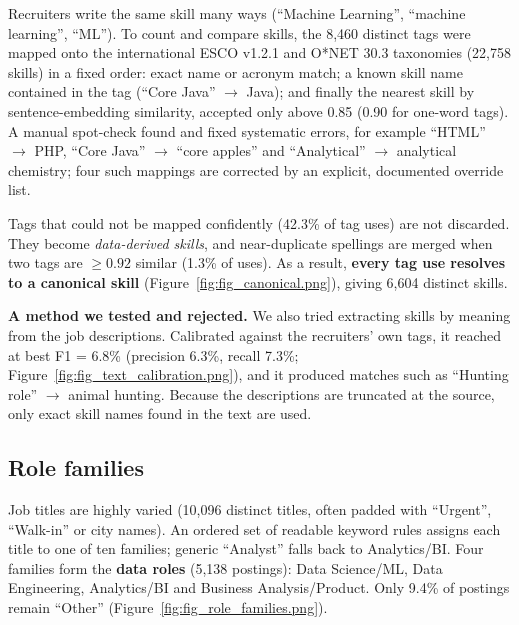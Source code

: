 Recruiters write the same skill many ways (``Machine Learning'', ``machine learning'', ``ML''). To
count and compare skills, the 8,460 distinct tags were mapped onto the international ESCO v1.2.1
and O*NET 30.3 taxonomies (22,758 skills) in a fixed order: exact name or acronym match;
a known skill name contained in the tag (``Core Java'' $\rightarrow$ Java); and finally the nearest
skill by sentence-embedding similarity, accepted only above 0.85 (0.90 for one-word tags). A manual
spot-check found and fixed systematic errors, for example ``HTML'' $\rightarrow$ PHP, ``Core Java''
$\rightarrow$ ``core apples'' and ``Analytical'' $\rightarrow$ analytical chemistry; four such
mappings are corrected by an explicit, documented override list.


Tags that could not be mapped confidently (42.3\% of tag uses) are not discarded. They become
\emph{data-derived skills}, and near-duplicate spellings are merged when two tags are
$\geq 0.92$ similar (1.3\% of uses). As a result, \textbf{every tag use resolves to a canonical skill}
(Figure~\ref{fig:fig_canonical.png}), giving 6,604 distinct skills.


\textbf{A method we tested and rejected.} We also tried extracting skills by meaning from the job
descriptions. Calibrated against the recruiters' own tags, it reached at best F1 = 6.8\%
(precision 6.3\%, recall 7.3\%; Figure~\ref{fig:fig_text_calibration.png}), and it produced
matches such as ``Hunting role'' $\rightarrow$ animal hunting. Because the descriptions are
truncated at the source, only exact skill names found in the text are used.


\subsection{Role families}\label{sec:families}

Job titles are highly varied (10,096 distinct titles, often padded with ``Urgent'', ``Walk-in'' or city
names). An ordered set of readable keyword rules assigns each title to one of ten families; generic
``Analyst'' falls back to Analytics/BI. Four families form the \textbf{data roles} (5,138 postings):
Data Science/ML, Data Engineering, Analytics/BI and Business Analysis/Product. Only 9.4\% of postings
remain ``Other'' (Figure~\ref{fig:fig_role_families.png}).

